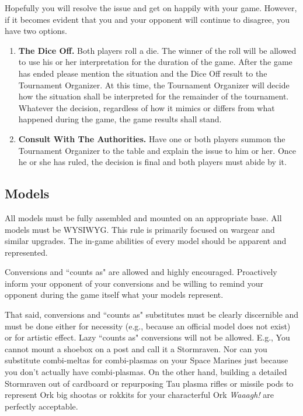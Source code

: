 \documentclass[12pt,titlepage]{article}
\begin{document}
Hopefully you will resolve the issue and get on happily with your game. However, if it becomes evident that you and your opponent will continue to disagree, you have two options.

\begin{enumerate}
\item \textbf{The Dice Off.} Both players roll a die. The winner of the roll will be allowed to use his or her interpretation for the duration of the game. After the game has ended please mention the situation and the Dice Off result to the Tournament Organizer. At this time, the Tournament Organizer will decide how the situation shall be interpreted for the remainder of the tournament. Whatever the decision, regardless of how it mimics or differs from what happened during the game, the game results shall stand.

\item \textbf{Consult With The Authorities.} Have one or both players summon the Tournament Organizer to the table and explain the issue to him or her. Once he or she has ruled, the decision is final and both players must abide by it.
\end{enumerate}

\subsection*{Models}

All models must be fully assembled and mounted on an appropriate base. All models must be WYSIWYG. This rule is primarily focused on wargear and similar upgrades. The in-game abilities of every model should be apparent and represented.

Conversions and ``counts as" are allowed and highly encouraged. Proactively inform your opponent of your conversions and be willing to remind your opponent during the game itself what your models represent.

That said, conversions and ``counts as" substitutes must be clearly discernible and must be done either for necessity (e.g., because an official model does not exist) or for artistic effect. Lazy ``counts as" conversions will not be allowed. E.g., You cannot mount a shoebox on a post and call it a Stormraven. Nor can you substitute combi-meltas for combi-plasmas on your Space Marines just because you don't actually have combi-plasmas. On the other hand, building a detailed Stormraven out of cardboard or repurposing Tau plasma rifles or missile pods to represent Ork big shootas or rokkits for your characterful Ork \textit{Waaagh!} are perfectly acceptable.
\end{document}
